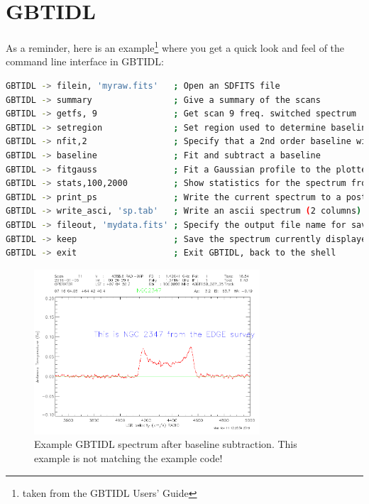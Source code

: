 \documentclass[12pt,a4paper]{article}
\begin{document}
\section{GBTIDL}

As a reminder, here is an example\footnote{taken from the GBTIDL Users' Guide}
where you get a quick look and feel of the command line interface in GBTIDL:

\begin{lstlisting}[language=bash]
% gbtidl                         # Start GBTIDL from the unix shell prompt
GBTIDL -> filein, 'myraw.fits'   ; Open an SDFITS file
GBTIDL -> summary                ; Give a summary of the scans
GBTIDL -> getfs, 9               ; Get scan 9 freq. switched spectrum
GBTIDL -> setregion              ; Set region used to determine baseline (interactive)
GBTIDL -> nfit,2                 ; Specify that a 2nd order baseline will be used
GBTIDL -> baseline               ; Fit and subtract a baseline
GBTIDL -> fitgauss               ; Fit a Gaussian profile to the plotted spectrum.
GBTIDL -> stats,100,2000         ; Show statistics for the spectrum from channel 100,2000
GBTIDL -> print_ps               ; Write the current spectrum to a postscript file
GBTIDL -> write_asci, 'sp.tab'   ; Write an ascii spectrum (2 columns)
GBTIDL -> fileout, 'mydata.fits' ; Specify the output file name for saved data
GBTIDL -> keep                   ; Save the spectrum currently displayed
GBTIDL -> exit                   ; Exit GBTIDL, back to the shell

\end{lstlisting}

\begin{figure}[ht]
\centering
  \includegraphics[width=0.75\textwidth]{gbtidl1.png}
\caption{\label{spectrum1} Example GBTIDL spectrum after baseline subtraction. This example is not matching the example code!}
\end{figure}
\end{document}
